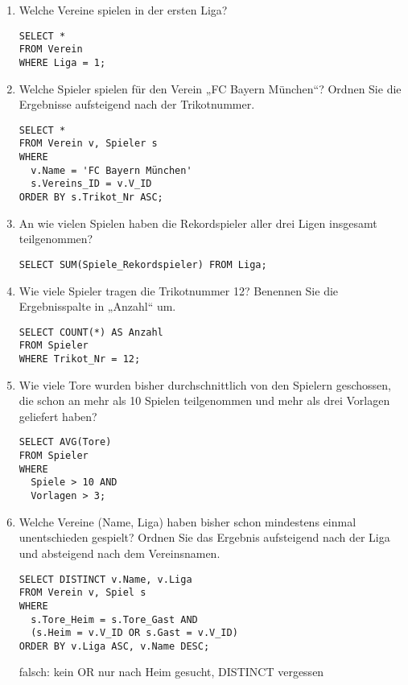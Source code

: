 \documentclass{lehramt-informatik}
\begin{document}
\begin{enumerate}

%

\item Welche Vereine spielen in der ersten Liga?

\begin{verbatim}
SELECT *
FROM Verein
WHERE Liga = 1;
\end{verbatim}

%

\item Welche Spieler spielen für den Verein „FC Bayern München“? Ordnen
Sie die Ergebnisse aufsteigend nach der Trikotnummer.

\begin{verbatim}
SELECT *
FROM Verein v, Spieler s
WHERE
  v.Name = 'FC Bayern München'
  s.Vereins_ID = v.V_ID
ORDER BY s.Trikot_Nr ASC;
\end{verbatim}

%

\item An wie vielen Spielen haben die Rekordspieler aller drei Ligen
insgesamt teilgenommen?

\begin{verbatim}
SELECT SUM(Spiele_Rekordspieler) FROM Liga;
\end{verbatim}

%

\item Wie viele Spieler tragen die Trikotnummer 12? Benennen Sie die
Ergebnisspalte in „Anzahl“ um.

\begin{verbatim}
SELECT COUNT(*) AS Anzahl
FROM Spieler
WHERE Trikot_Nr = 12;
\end{verbatim}

%

\item Wie viele Tore wurden bisher durchschnittlich von den Spielern
geschossen, die schon an mehr als 10 Spielen teilgenommen und mehr als
drei Vorlagen geliefert haben?

\begin{verbatim}
SELECT AVG(Tore)
FROM Spieler
WHERE
  Spiele > 10 AND
  Vorlagen > 3;
\end{verbatim}

%

\item Welche Vereine (Name, Liga) haben bisher schon mindestens einmal
unentschieden gespielt? Ordnen Sie das Ergebnis aufsteigend nach der
Liga und absteigend nach dem Vereinsnamen.

\begin{verbatim}
SELECT DISTINCT v.Name, v.Liga
FROM Verein v, Spiel s
WHERE
  s.Tore_Heim = s.Tore_Gast AND
  (s.Heim = v.V_ID OR s.Gast = v.V_ID)
ORDER BY v.Liga ASC, v.Name DESC;
\end{verbatim}

falsch: kein OR nur nach Heim gesucht, DISTINCT vergessen
\end{enumerate}
\end{document}
